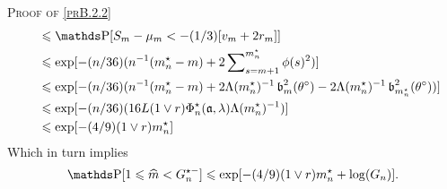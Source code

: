 \begin{pro}{\textsc{Proof of \textsc{\cref{prB.2.2}}} \\}
\begin{alignat*}{2}
& && \leq \P[S_{m} - \mu_{m} < - (1/3) [v_{m} + 2 r_{m}]]\\
& && \leq \exp[- (n/36)(n^{-1} (m_{n}^{\star} - m) + 2 \sum\nolimits_{s= m + 1}^{m_{n}^{\star}}\phi(s)^{2})]\\
& && \leq \exp[- (n/36) (n^{-1}(m_{n}^{\star} - m) + 2 \Lambda(m_{n}^{\star})^{-1}\b_{m}^{2}(\theta^{\circ}) - 2 \Lambda(m_{n}^{\star})^{-1}\b_{m_{n}^{\star}}^{2}(\theta^{\circ})) ]\\
& && \leq \exp[- (n/36) (16 L (1 \vee r) \Phi_{n}^{\star}(\mathfrak{a}, \lambda) \Lambda(m_{n}^{\star})^{-1})]\\
& && \leq \exp [ - (4/9) (1 \vee r)m_{n}^{\star} ]
\end{alignat*}
Which in turn implies
\[\P[1 \leq \widehat{m} < G_{n}^{\star-}] \leq \exp[ - (4/9) (1 \vee r) m_{n}^{\star} + \log(G_{n})].\]
\proEnd
\end{pro}